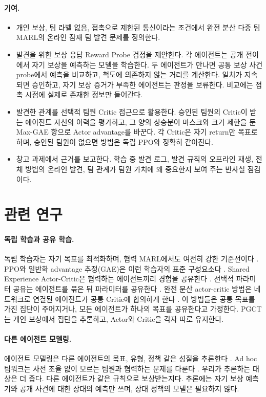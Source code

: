 \documentclass[10pt,twocolumn,letterpaper]{article}
\begin{document}
\paragraph{기여.}
\begin{itemize}\setlength\itemsep{1pt}
\item 개인 보상, 팀 라벨 없음, 접촉으로 제한된 통신이라는 조건에서 완전 분산 다중 팀 MARL의 온라인 잠재 팀 발견 문제를 정의한다.
\item 발견을 위한 보상 응답 Reward Probe 검정을 제안한다. 각 에이전트는 공개 전이에서 자기 보상을 예측하는 모델을 학습한다. 두 에이전트가 만나면 공통 보상 사건 probe에서 예측을 비교하고, 척도에 의존하지 않는 거리를 계산한다. 일치가 지속되면 승인하고, 자기 보상 증거가 부족한 에이전트는 판정을 보류한다. 비교에는 접촉 시점에 실제로 존재한 정보만 들어간다.
\item 발견한 관계를 선택적 팀원 Critic 접근으로 활용한다. 승인된 팀원의 Critic이 받는 에이전트 자신의 이력을 평가하고, 그 양의 상승분이 마스크와 크기 제한을 둔 Max-GAE 항으로 Actor advantage를 바꾼다. 각 Critic은 자기 return만 목표로 하며, 승인된 팀원이 없으면 방법은 독립 PPO와 정확히 같아진다.
\item 창고 과제에서 근거를 보고한다. 학습 중 발견 로그, 발견 규칙의 오프라인 재생, 전체 방법의 온라인 발견, 팀 관계가 팀원 가치에 왜 중요한지 보여 주는 반사실 점검이다.
\end{itemize}

\section{관련 연구}
\paragraph{독립 학습과 공유 학습.}
독립 학습자는 자기 목표를 최적화하며, 협력 MARL에서도 여전히 강한 기준선이다 \citep{tan,ippo,benchmark}. PPO와 일반화 advantage 추정(GAE)은 이런 학습자의 표준 구성요소다 \citep{ppo,gae,mappo}. Shared Experience Actor-Critic은 협력하는 에이전트끼리 경험을 공유한다 \citep{seac}. 선택적 파라미터 공유는 에이전트를 묶은 뒤 파라미터를 공유한다 \citep{seps}. 완전 분산 actor-critic 방법은 네트워크로 연결된 에이전트가 공통 Critic에 합의하게 한다 \citep{fdmarl}. 이 방법들은 공통 목표를 가진 집단이 주어지거나, 모든 에이전트가 하나의 목표를 공유한다고 가정한다. PGCT는 개인 보상에서 집단을 추론하고, Actor와 Critic을 각자 따로 유지한다.

\paragraph{다른 에이전트 모델링.}
에이전트 모델링은 다른 에이전트의 목표, 유형, 정책 같은 성질을 추론한다 \citep{modelling}. Ad hoc 팀워크는 사전 조율 없이 모르는 팀원과 협력하는 문제를 다룬다 \citep{adhoc}. 우리가 추론하는 대상은 더 좁다. 다른 에이전트가 같은 규칙으로 보상받는지다. 추론에는 자기 보상 예측기와 공개 사건에 대한 상대의 예측만 쓰며, 상대 정책의 모델은 필요하지 않다.
\end{document}
